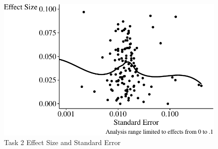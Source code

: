 \documentclass[
  letterpaper,
  DIV=11,
  numbers=noendperiod]{scrartcl}
\begin{document}
\begin{figure}

{\centering \includegraphics{The-Sources-of-Researcher-Variation-in-Economics_files/figure-pdf/fig-effect-vs-se-1.pdf}

}

\caption{\label{fig-effect-vs-se}Task 2 Effect Size and Standard Error}

\end{figure}
\end{document}
